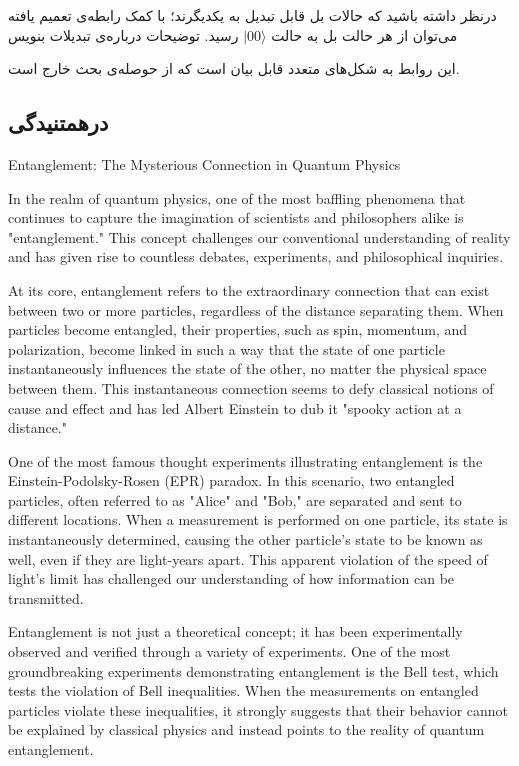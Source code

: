 \documentclass{book}
\begin{document}
درنظر داشته باشید که حالات بل قابل تبدیل به یکدیگرند؛ با کمک رابطه‌ی تعمیم یافته ‌می‌توان از هر حالت بل به حالت $\vert00 \rangle$ رسید.
توضیحات درباره‌ی تبدیلات بنویس

این روابط به شکل‌های متعدد قابل بیان است که از حوصله‌ی بحث خارج است.
\newpage






\subsection{درهمتنیدگی}

Entanglement: The Mysterious Connection in Quantum Physics

In the realm of quantum physics, one of the most baffling phenomena that continues to capture the imagination of scientists and philosophers alike is "entanglement." This concept challenges our conventional understanding of reality and has given rise to countless debates, experiments, and philosophical inquiries.

At its core, entanglement refers to the extraordinary connection that can exist between two or more particles, regardless of the distance separating them. When particles become entangled, their properties, such as spin, momentum, and polarization, become linked in such a way that the state of one particle instantaneously influences the state of the other, no matter the physical space between them. This instantaneous connection seems to defy classical notions of cause and effect and has led Albert Einstein to dub it "spooky action at a distance."

One of the most famous thought experiments illustrating entanglement is the Einstein-Podolsky-Rosen (EPR) paradox. In this scenario, two entangled particles, often referred to as "Alice" and "Bob," are separated and sent to different locations. When a measurement is performed on one particle, its state is instantaneously determined, causing the other particle's state to be known as well, even if they are light-years apart. This apparent violation of the speed of light's limit has challenged our understanding of how information can be transmitted.

Entanglement is not just a theoretical concept; it has been experimentally observed and verified through a variety of experiments. One of the most groundbreaking experiments demonstrating entanglement is the Bell test, which tests the violation of Bell inequalities. When the measurements on entangled particles violate these inequalities, it strongly suggests that their behavior cannot be explained by classical physics and instead points to the reality of quantum entanglement.
\end{document}
